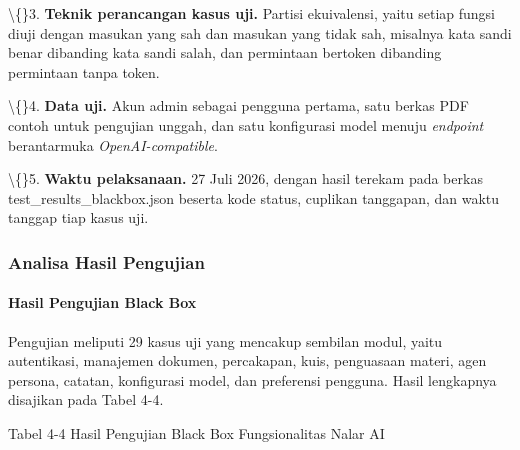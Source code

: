 \documentclass[12pt,a4paper]{article}
\begin{document}
\textbackslash\{\}3. \textbf{Teknik perancangan kasus uji.} Partisi ekuivalensi, yaitu setiap fungsi diuji dengan masukan yang sah dan masukan yang tidak sah, misalnya kata sandi benar dibanding kata sandi salah, dan permintaan bertoken dibanding permintaan tanpa token.

\textbackslash\{\}4. \textbf{Data uji.} Akun admin sebagai pengguna pertama, satu berkas PDF contoh untuk pengujian unggah, dan satu konfigurasi model menuju \textit{endpoint} berantarmuka \textit{OpenAI-compatible}.

\textbackslash\{\}5. \textbf{Waktu pelaksanaan.} 27 Juli 2026, dengan hasil terekam pada berkas test\_results\_blackbox.json beserta kode status, cuplikan tanggapan, dan waktu tanggap tiap kasus uji.

\subsubsection*{Analisa Hasil Pengujian}
\paragraph*{Hasil Pengujian Black Box}
Pengujian meliputi 29 kasus uji yang mencakup sembilan modul, yaitu autentikasi, manajemen dokumen, percakapan, kuis, penguasaan materi, agen persona, catatan, konfigurasi model, dan preferensi pengguna. Hasil lengkapnya disajikan pada Tabel 4-4.

Tabel 4-4	Hasil Pengujian Black Box Fungsionalitas Nalar AI
\end{document}
